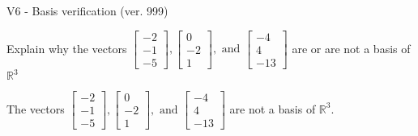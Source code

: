 \begin{exercise}
  \begin{exerciseTitle}V6 - Basis verification (ver. 999)\end{exerciseTitle}
  \begin{exerciseStatement}
    Explain why the vectors \(\left[\begin{array}{r}
-2 \\
-1 \\
-5
\end{array}\right] , \left[\begin{array}{r}
0 \\
-2 \\
1
\end{array}\right] , \text{ and } \left[\begin{array}{r}
-4 \\
4 \\
-13
\end{array}\right]\) are or are not a basis of \(\mathbb{R}^3\)	


  \end{exerciseStatement}
  \begin{exerciseAnswer}
   The vectors \(\left[\begin{array}{r}
-2 \\
-1 \\
-5
\end{array}\right] , \left[\begin{array}{r}
0 \\
-2 \\
1
\end{array}\right] , \text{ and } \left[\begin{array}{r}
-4 \\
4 \\
-13
\end{array}\right]\) 
  	 are not  a basis of \(\mathbb{R}^3\).
  


  \end{exerciseAnswer}
\end{exercise}